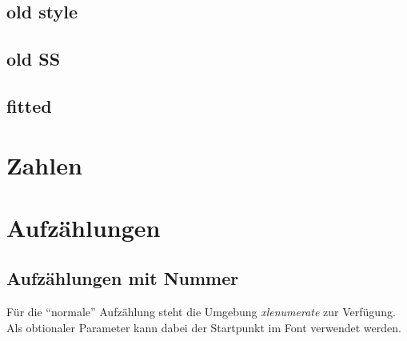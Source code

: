 \documentclass{fontdokuold}
\begin{document}
\subsection{old style}

\subsection{old SS}

\subsection{fitted}

\section{Zahlen}

\begin{minipage}{\linewidth}
\begin{minipage}{.45\linewidth}
\Large
{}
\end{minipage}\hfill
\begin{minipage}{.45\linewidth}
\Large
{}
\end{minipage}
\end{minipage}



\section{Aufzählungen}
\subsection{Aufzählungen mit Nummer}

Für die "`normale"' Aufzählung steht die Umgebung \emph{xlenumerate} zur Verfügung.
Als obtionaler Parameter kann dabei der Startpunkt im Font verwendet werden.
\end{document}

